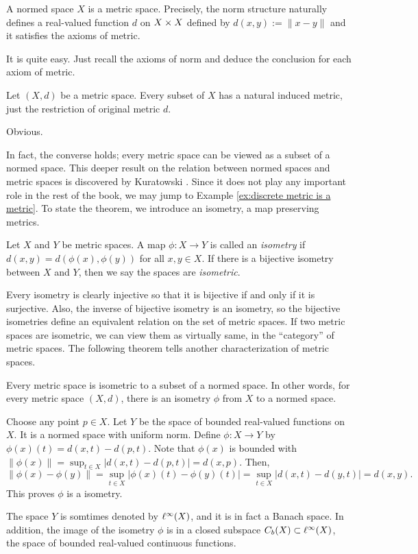 \begin{ex}
A normed space $X$ is a metric space.
Precisely, the norm structure naturally defines a real-valued function $d$ on $X\times X$ defined by $d(x,y):=\|x-y\|$ and it satisfies the axioms of metric.
\end{ex}
\begin{pf}
It is quite easy.
Just recall the axioms of norm and deduce the conclusion for each axiom of metric.
\end{pf}
\begin{ex}
Let $(X,d)$ be a metric space.
Every subset of $X$ has a natural induced metric, just the restriction of original metric $d$.
\end{ex}
\begin{pf}
Obvious.
\end{pf}

In fact, the converse holds; every metric space can be viewed as a subset of a normed space.
This deeper result on the relation between normed spaces and metric spaces is discovered by Kuratowski \cite{}.
Since it does not play any important role in the rest of the book, we may jump to Example \ref{ex:discrete metric is a metric}.
To state the theorem, we introduce an isometry, a map preserving metrics.

\begin{defn}
Let $X$ and $Y$ be metric spaces.
A map $\phi:X\to Y$ is called an \emph{isometry} if $d(x,y)=d(\phi(x),\phi(y))$ for all $x,y\in X$.
If there is a bijective isometry between $X$ and $Y$, then we say the spaces are \emph{isometric}.
\end{defn}

Every isometry is clearly injective so that it is bijective if and only if it is surjective.
Also, the inverse of bijective isometry is an isometry, so the bijective isometries define an equivalent relation on the set of metric spaces.
If two metric spaces are isometric, we can view them as virtually same, in the ``category'' of metric spaces.
The following theorem tells another characterization of metric spaces.

\begin{thm}
Every metric space is isometric to a subset of a normed space.
In other words, for every metric space $(X,d)$, there is an isometry $\phi$ from $X$ to a normed space.
\end{thm}
\begin{pf}
Choose any point $p\in X$.
Let $Y$ be the space of bounded real-valued functions on $X$.
It is a normed space with uniform norm.
Define $\phi:X\to Y$ by $\phi(x)(t)=d(x,t)-d(p,t)$.
Note that $\phi(x)$ is bounded with $\|\phi(x)\|=\sup_{t\in X}|d(x,t)-d(p,t)|=d(x,p)$.
Then,
\[\|\phi(x)-\phi(y)\|=\sup_{t\in X}|\phi(x)(t)-\phi(y)(t)|=\sup_{t\in X}|d(x,t)-d(y,t)|=d(x,y).\]
This proves $\phi$ is a isometry.
\end{pf}
\begin{rmk}
The space $Y$ is somtimes denoted by $\ell^\infty(X)$, and it is in fact a Banach space.
In addition, the image of the isometry $\phi$ is in a closed subspace $C_b(X)\subset\ell^\infty(X)$, the space of bounded real-valued continuous functions.
\end{rmk}

